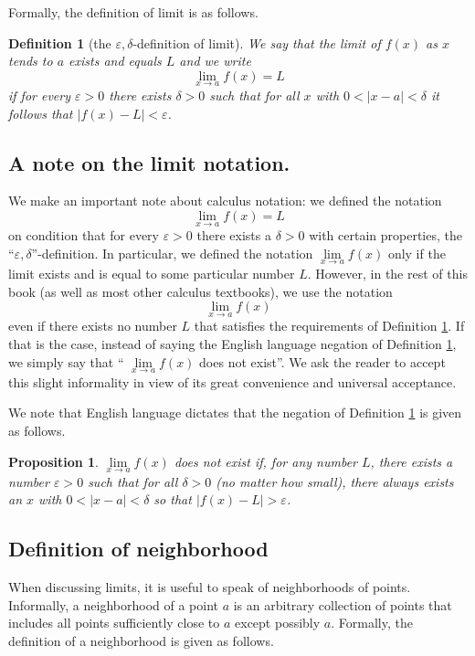 \documentclass[12pt]{book}
\newtheorem{definition}[theorem]{Definition}
\newtheorem{proposition}[theorem]{Proposition}
\begin{document}
Formally, the definition of limit is as follows.
\begin{definition}[the $\varepsilon, \delta$-definition of limit] \label{defLimit}
We say that the limit of $f(x)$ as $x$ tends to $a$ exists and equals $L$ and we write 
\[
\lim_{x\to a} f(x)=L
\]
if for every $\varepsilon>0$ there exists $\delta>0$ such that for all $x$ with $0<|x-a|<\delta$ it follows that  $|f(x)-L|<\varepsilon$.
\end{definition}
\subsection{A note on the limit notation.}
We make an important note about calculus notation: we defined the notation
\[
\lim\limits_{x\to a} f(x)=L
\]
on condition that for every $\varepsilon>0$ there exists a $\delta>0$ with certain properties,  the ``$\varepsilon, \delta$''-definition. In particular, we defined the notation $\lim\limits_{x\to a}f(x)$ only if the limit exists and is equal to some particular number $L$. However, in the rest of this book (as well as most other calculus textbooks), we use the notation
\[
\lim\limits_{x\to a}f(x)
\]
even if there exists no number $L$ that satisfies the requirements of Definition \ref{defLimit}. If that is the case, instead of saying the English language negation of Definition \ref{defLimit}, we simply say that `` $\lim\limits_{x\to a}f(x)$ does not exist''. We ask the reader to accept this slight informality in view of its great convenience and universal acceptance.

We note that English language dictates that the negation of Definition \ref{defLimit} is given as follows. 
\begin{proposition}\label{propLimitDoesntExist}
$\lim\limits_{x\to a}f(x) $ does not exist if, for any number $L$, there exists a number $\varepsilon>0$ such that for all $\delta>0$ (no matter how small), there always exists an $x$ with $0<|x-a|<\delta$ so that $|f(x)-L|>\varepsilon$.
\end{proposition}

\subsection{Definition of neighborhood}
When discussing limits, it is useful to speak of neighborhoods of points. Informally, a neighborhood of a point $a$ is an arbitrary collection of points that  includes all points sufficiently close to $a$ except possibly $a$. Formally, the definition of a neighborhood is given as follows.
\end{document}
